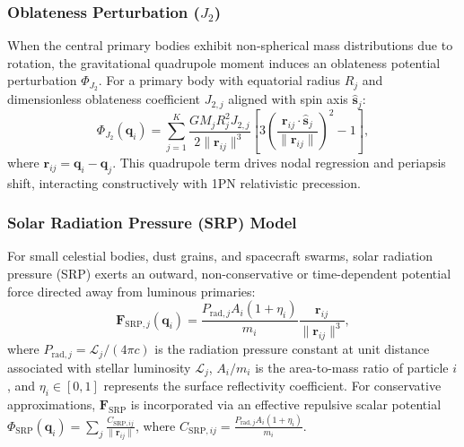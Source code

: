 \documentclass[preprint,12pt,3p]{elsarticle}
\begin{document}
\subsubsection{Oblateness Perturbation ($J_2$)}
When the central primary bodies exhibit non-spherical mass distributions due to rotation, the gravitational quadrupole moment induces an oblateness potential perturbation $\Phi_{J_2}$. For a primary body with equatorial radius $R_j$ and dimensionless oblateness coefficient $J_{2,j}$ aligned with spin axis $\hat{\bm{s}}_j$:
\begin{equation}
\Phi_{J_2}(\bm{q}_i) = \sum_{j=1}^{K} \frac{G M_j R_j^2 J_{2,j}}{2 \|\bm{r}_{ij}\|^3} \left[ 3 \left( \frac{\bm{r}_{ij} \cdot \hat{\bm{s}}_j}{\|\bm{r}_{ij}\|} \right)^2 - 1 \right],
\label{eq:j2_potential}
\end{equation}
where $\bm{r}_{ij} = \bm{q}_i - \bm{q}_j$. This quadrupole term drives nodal regression and periapsis shift, interacting constructively with 1PN relativistic precession.

\subsubsection{Solar Radiation Pressure (SRP) Model}
For small celestial bodies, dust grains, and spacecraft swarms, solar radiation pressure (SRP) exerts an outward, non-conservative or time-dependent potential force directed away from luminous primaries:
\begin{equation}
\bm{F}_{\mathrm{SRP}, j}(\bm{q}_i) = \frac{P_{\mathrm{rad}, j} A_i (1 + \eta_i)}{m_i} \frac{\bm{r}_{ij}}{\|\bm{r}_{ij}\|^3},
\label{eq:srp_force}
\end{equation}
where $P_{\mathrm{rad}, j} = \mathcal{L}_j / (4 \pi c)$ is the radiation pressure constant at unit distance associated with stellar luminosity $\mathcal{L}_j$, $A_i / m_i$ is the area-to-mass ratio of particle $i$, and $\eta_i \in [0, 1]$ represents the surface reflectivity coefficient. For conservative approximations, $\bm{F}_{\mathrm{SRP}}$ is incorporated via an effective repulsive scalar potential $\Phi_{\mathrm{SRP}}(\bm{q}_i) = \sum_{j} \frac{C_{\mathrm{SRP}, ij}}{\|\bm{r}_{ij}\|}$, where $C_{\mathrm{SRP}, ij} = \frac{P_{\mathrm{rad}, j} A_i (1 + \eta_i)}{m_i}$.
\end{document}
